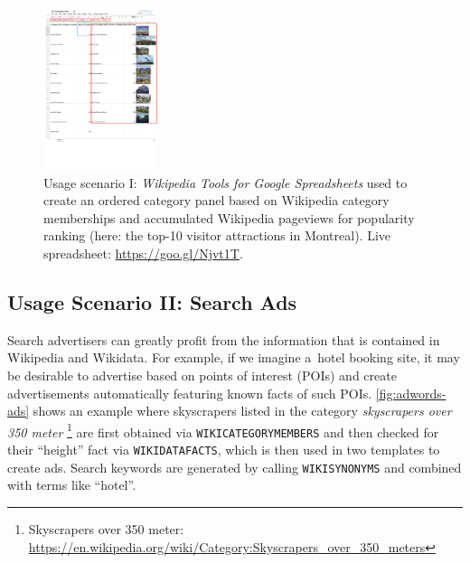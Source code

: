 \documentclass{sig-alternate-05-2015}
\newcommand{\inlinelistingsize}{\fontsize{8pt}{11pt}}
\let\oldurl\url
\renewcommand{\url}[1]{\inlinelistingsize\oldurl{#1}}
\begin{document}
\begin{figure}[p!]
  \centering
  \includegraphics[width=0.3\textwidth]{knowledge-graph}
  \caption{Usage scenario I: \emph{Wikipedia Tools for Google Spreadsheets} used to create an ordered category panel based on Wikipedia category memberships and accumulated Wikipedia pageviews for popularity ranking (here: the top-10 visitor attractions in Montreal). Live spreadsheet: \url{https://goo.gl/Njvt1T}.}
  \label{fig:knowledge-graph}
\end{figure}

\subsection{Usage Scenario II: Search Ads}

Search advertisers can greatly profit from the information
that is contained in Wikipedia and Wikidata.
For example, if we imagine a~hotel booking site,
it may be desirable to advertise based on points of interest (POIs)
and create advertisements automatically featuring known facts of such POIs.
\autoref{fig:adwords-ads} shows an example where skyscrapers listed in the category
\emph{skyscrapers over 350 meter}%
\footnote{Skyscrapers over 350 meter:
\url{https://en.wikipedia.org/wiki/Category:Skyscrapers_over_350_meters}}
 are first obtained via \texttt{WIKICATEGORYMEMBERS}
and then checked for their ``height'' fact via \texttt{WIKIDATAFACTS},
which is then used in two templates to create ads.
Search keywords are generated by calling \texttt{WIKISYNONYMS} and combined with terms like ``hotel''.
\end{document}
